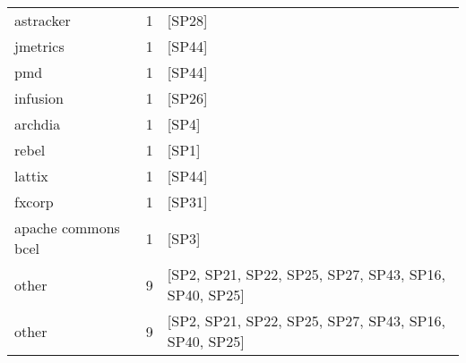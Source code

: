 \begin{tabular}{lrl}
           astracker &      1 &                                                 [SP28] \\
            jmetrics &      1 &                                                 [SP44] \\
                 pmd &      1 &                                                 [SP44] \\
            infusion &      1 &                                                 [SP26] \\
             archdia &      1 &                                                  [SP4] \\
               rebel &      1 &                                                  [SP1] \\
              lattix &      1 &                                                 [SP44] \\
              fxcorp &      1 &                                                 [SP31] \\
 apache commons bcel &      1 &                                                  [SP3] \\
               other &      9 &  [SP2, SP21, SP22, SP25, SP27, SP43, SP16, SP40, SP25] \\
               other &      9 &  [SP2, SP21, SP22, SP25, SP27, SP43, SP16, SP40, SP25] \\
\bottomrule
\end{tabular}
